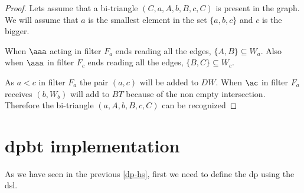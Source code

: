 \begin{proof}
\iffalse
Obvious from the definition of $I,J,K$  and the algorithm of obtaining bi-triangles. 
\fi
Lets assume that a bi-triangle $(C,a,A,b,B,c,C)$ is present in the graph. We will assume that $a$ is the smallest element in the set $\{a,b,c\}$ and $c$ is the bigger.

When $\aaa$ acting in filter $F_a$ ends reading all the edges, $\{A,B\} \subseteq W_a$. Also when $\aaa$ in filter $F_c$ ends reading all the edges, $\{B,C\} \subseteq W_c$. 

As $a < c$  in filter $F_a$ the pair $(a,c)$  will be added to 
$DW$. When $\ac$ in filter $F_a$ receives $(b, W_b)$ will add to $BT$ because of the non empty intersection. Therefore the bi-triangle $(a,A,b,B,c,C)$ can be recognized
\end{proof}
\iffalse
So we are going to talk from now on about the bi-triangles stored in filter $F_a$.

At the end of the execution of $\ac$ $F_a$ constructs the sets where to choose $A,B,C$ $\at$

Actor 1 collects in $F_a$ all the nodes in $U$ adjacent to $a$ i.e. all the candidates to choose $A$. Afterward this set will be reduced. 

Actor 2 receives pairs $(c,V)$ where $V$ are all the nodes adjacent to $c$ in order to test the possibility of constructing a new double wedge.  If the conditions are fulfilled, it adds the double wedge $\la (a,c), U_{t_1} \ra$,  or $\la (c, a), U_{t_2} \ra$. 

In each filter, the pair of lower vertices in the double edges are pairs constructed by $a$ and vertices that are parameters of filters that are before the filter $F_a$. Therefore, the double edges recorded are present in at most one filter.

Actor 3 receives pairs $(b,M) $ where $M$ are all the nodes adjacent to $b$ and has in memory a set of double wedges $\la (a,c), l_2), U_{t_1} \ra$

$\ac$ accepts b as a candidate to construct an element of the set of aggregate bi-triangles if $a < b < c$. Therefore the aggregated bi-triangles so constructed are recorded in a single filter due to the fact that that the pair $(a,c)$ is present in a single filter.
\fi

        
 
\section{\acrshort{dpbt} implementation}
As we have seen in the previous \autoref{dp-hs}, first we need to define the \acrshort{dp} using the \acrshort{dsl}.


